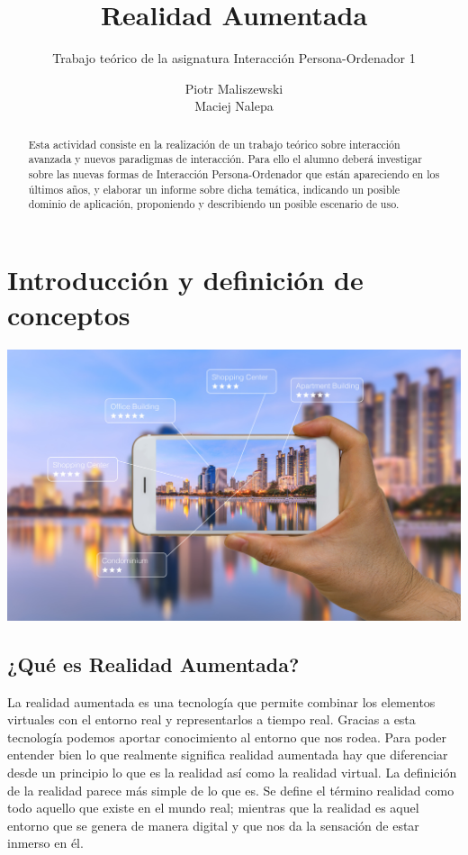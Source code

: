 \documentclass[a4paper,11pt]{scrartcl}
\title{Realidad Aumentada}
\subtitle{Trabajo teórico de la asignatura Interacción Persona-Ordenador 1}
\author{Piotr Maliszewski\\Maciej Nalepa}
\begin{document}
\maketitle

\begin{abstract}

Esta actividad consiste en la realización de un trabajo teórico sobre interacción avanzada y
nuevos paradigmas de interacción. Para ello el alumno deberá investigar sobre las nuevas
formas de Interacción Persona-Ordenador que están apareciendo en los últimos años, y elaborar un
informe sobre dicha temática, indicando un posible dominio de aplicación, proponiendo y
describiendo un posible escenario de uso.

\end{abstract}

\section{Introducción y definición de conceptos}
\begin{center}
    \includegraphics[width=0.7\linewidth]{augmented}
\end{center}
\subsection{¿Qué es Realidad Aumentada?}
La realidad aumentada es una tecnología que permite combinar los elementos virtuales con el entorno real y representarlos a tiempo real. Gracias a esta tecnología podemos aportar conocimiento al entorno que nos rodea. Para poder entender bien lo que realmente significa realidad aumentada hay que diferenciar desde un principio lo que es la realidad así como la realidad virtual. La definición de la realidad parece más simple de lo que es. Se define el término realidad como todo aquello que existe en el mundo real; mientras que la realidad es aquel entorno que se genera de manera digital y que nos da la sensación de estar inmerso en él.
\end{document}
